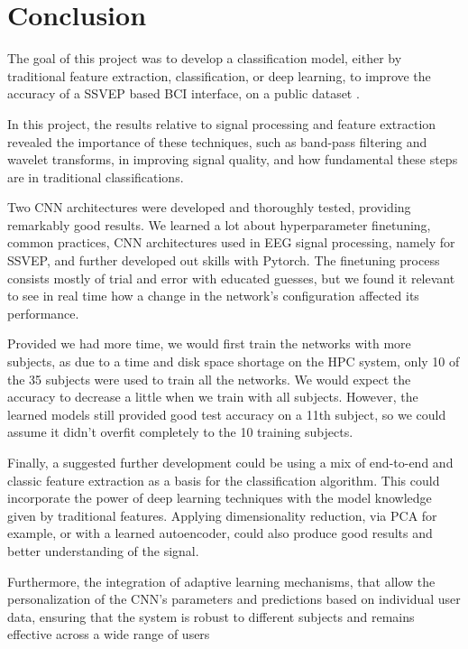 \section{Conclusion}





The goal of this project was to develop a classification model, either by traditional feature extraction, classification, or deep learning, to improve the accuracy of a SSVEP based BCI interface, on a public dataset \cite{wang2017benchmark}.

In this project, the results relative to signal processing and feature extraction revealed the importance of these techniques, such as band-pass filtering and wavelet transforms, in improving signal quality, and how fundamental these steps are in traditional classifications.

Two CNN architectures were developed and thoroughly tested, providing remarkably good results. We learned a lot about hyperparameter finetuning, common practices, CNN architectures used in EEG signal processing, namely for SSVEP, and further developed out skills with Pytorch. The finetuning process consists mostly of trial and error with educated guesses, but we found it relevant to see in real time how a change in the network's configuration affected its performance.

Provided we had more time, we would first train the networks with more subjects, as due to a time and disk space shortage on the HPC system, only 10 of the 35 subjects were used to train all the networks. We would expect the accuracy to decrease a little when we train with all subjects. However, the learned models still provided good test accuracy on a 11th subject, so we could assume it didn't overfit completely to the 10 training subjects. 

Finally, a suggested further development could be using a mix of end-to-end and classic feature extraction as a basis for the classification algorithm. This could incorporate the power of deep learning techniques with the model knowledge given by traditional features. Applying dimensionality reduction, via PCA for example, or with a learned autoencoder, could also produce good results and better understanding of the signal.

Furthermore, the integration of adaptive learning mechanisms, that allow the personalization of the CNN's parameters and predictions based on individual user data, ensuring that the system is robust to different subjects and remains effective across a wide range of users





